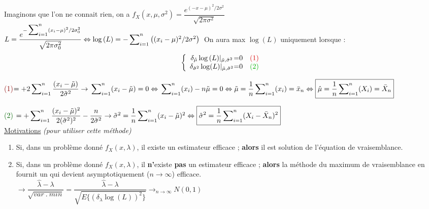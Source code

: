 \documentclass{article}
\newcommand{\mti}{\tilde{\mu}}
\newcommand{\sti}{\tilde{\sigma}}
\newcommand{\lcha}{\hat{\lambda}}
\newcommand{\mcha}{\hat{\mu}}
\newcommand{\scha}{\hat{\sigma}}
\begin{document}
\noindent Imaginons que l'on ne connait rien, on a $f_X(x,\mu,\sigma^2) =
\dfrac{e^{(-x-\mu)^2 / 2\sigma^2}}{\sqrt{2\pi\sigma^2}}$ \\
$L =  \dfrac{e^{-\sideset{}{_{i=1}^n}\sum(x_i-\mu)^2 / 2\sigma_0^2}} {\sqrt{2\pi\sigma_0^2}} \\
\Leftrightarrow \log{(L)} = - \sideset{}{_{i=1}^n}\sum \left((x_i-\mu)^2 / 2\sigma^2\right) \\$
On aura max $\log{(L)}$ uniquement lorsque : \\

\[
 \left \{
 \begin{array}{c @{ = } c c}
   \delta_{\mti} \log{(L)} |_{\mti ,\scha^{2}} & 0 & \textcolor{darkred}{(1)} \\
   \delta_{\scha^ 2} \log(L) |_{\mti ,\scha ^2} & 0 & \textcolor{darkgreen}{(2)}\\
 \end{array}
 \right.
\]

\textcolor{darkred}{(1)}$= + 2\sideset{}{_{i=1}^n}\sum \dfrac{(x_i-\mti)}{2\sti^2} \\
\rightarrow \sideset{}{_{i=1}^n}\sum (x_i-\mti) = 0 \\
\Leftrightarrow \sideset{}{_{i=1}^n}\sum (x_i) - n \mti = 0 \\
\Leftrightarrow \mti = \dfrac{1}{n} \sideset{}{_{i=1}^n}\sum (x_i) = \bar{x}_n \\
\Leftrightarrow \boxed{\mcha = \dfrac{1}{n} \sideset{}{_{i=1}^n}\sum (X_i) = \bar{X}_n} \\$

\textcolor{darkgreen}{(2)} $= + \sideset{}{_{i=1}^n}\sum \dfrac{(x_i-\mti)^2}{2(\sti^2)^2} - \dfrac{n}{2\sti^2} \\
\rightarrow \sti^2 = \dfrac{1}{n} \sideset{}{_{i=1}^n}\sum (x_i-\mti)^2 \\
\Leftrightarrow \boxed{\scha^2 = \dfrac{1}{n} \sideset{}{_{i=1}^n}\sum (X_i-\bar{X}_n)^2}$ \\


\noindent \underline{Motivations} \textit{(pour utiliser cette méthode)}

\begin{enumerate}
\item Si, dans un problème donné $f_X(x,\lambda)$, il existe un estimateur efficace ; \textbf{alors} il est solution de
l'équation de vraisemblance.
\item Si, dans un problème donné $f_X(x,\lambda)$, il \textbf{n'}existe \textbf{pas} un estimateur efficace ; \textbf{alors}
la méthode du maximum de vraisemblance en fournit un qui devient asymptotiquement ($n\to\infty$) efficace. \\

$\rightarrow \dfrac{\lcha - \lambda}{\sqrt{var\ .\ min}} = \dfrac{\lcha - \lambda}{\sqrt{E\{(\delta_\lambda \log{(L)})^2\}}}
 \rightarrow_{n\to\infty} N(0,1)$ \\
\end{enumerate}
\end{document}
